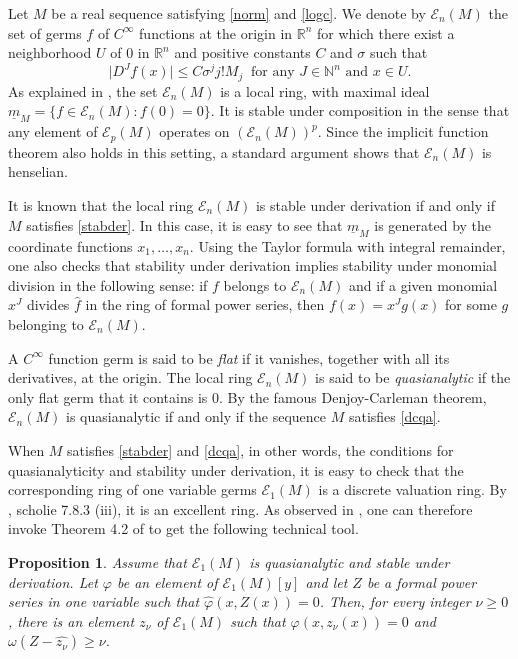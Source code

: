 \documentclass[a4paper]{amsart}
\theoremstyle{plain}
\newtheorem{prop}{Proposition}
\theoremstyle{remark}
\newcommand{\imax}{\underline{m}}
\begin{document}
Let $ M $ be a real sequence satisfying \eqref{norm} and \eqref{logc}. We denote by $ \mathcal{E}_n(M) $ the set of germs $ f $ of $ C^\infty $ functions at the origin in $ \mathbb{R}^n $ for which there exist a neighborhood $ U $ of $ 0 $ in $ \mathbb{R}^n $ and positive constants $ C $ and $ \sigma $ such that
\begin{equation}
\big\vert D^Jf(x)\big\vert \leq C\sigma^jj!M_j\ \textrm{ for any } J\in \mathbb{N}^n\textrm{ and } x\in U.
\end{equation}
As explained in \cite{Th}, the set $ \mathcal{E}_n(M) $ is a local ring, with maximal ideal $ \imax_M=\{f\in\mathcal{E}_n(M) : f(0)=0\} $. It is stable under composition in the sense that any element of $ \mathcal{E}_p(M) $ operates on $ (\mathcal{E}_n(M))^p$. Since the implicit function theorem also holds in this setting, a standard argument shows that $ \mathcal{E}_n(M) $ is henselian.

It is known that the local ring $ \mathcal{E}_n(M) $ is stable under derivation if and only if $ M $ satisfies \eqref{stabder}. In this case, it is easy to see that $ \imax_M $ is generated by the coordinate functions $ x_1,\ldots,x_n $. Using the Taylor formula with integral remainder, one also checks that stability under derivation implies stability under monomial division in the following sense: if $ f $ belongs to $ \mathcal{E}_n(M) $ and if a given monomial $ x^J $ divides $ \widehat{f}$ in the ring of formal power series, then $ f(x)=x^Jg(x) $ for some $ g $ belonging to $ \mathcal{E}_n(M) $.  

A $ C^\infty$ function germ is said to be \emph{flat} if it vanishes, together with all its derivatives, at the origin. The local ring $ \mathcal{E}_n(M) $ is said to be \emph{quasianalytic} if the only flat germ that it contains is $ 0 $. By the famous Denjoy-Carleman theorem, $ \mathcal{E}_n(M) $ is quasianalytic if and only if the sequence $ M $ satisfies \eqref{dcqa}. 

When $ M $ satisfies \eqref{stabder} and \eqref{dcqa}, in other words, the conditions for quasianalyticity and stability under derivation, it is easy to check that the corresponding ring of one variable germs $ \mathcal{E}_1(M) $ is a discrete valuation ring. By \cite{Groth}, scholie 7.8.3 (iii), it is an excellent ring. As observed in \cite{Pier}, one can therefore invoke Theorem 4.2 of \cite{Ro} to get the following technical tool. 

\begin{prop}\label{Artin}
Assume that $ \mathcal{E}_1(M) $ is quasianalytic and stable under derivation. Let $ \varphi $ be an element of $ \mathcal{E}_1(M)[y] $ and let $ Z $ be a formal power series in one variable such that $ \widehat{\varphi}(x,Z(x))=0 $. Then, for every integer $ \nu\geq 0 $, there is an element $ z_\nu $ of $ \mathcal{E}_1(M) $ such that 
$ \varphi(x,z_\nu(x))=0 $ and $ \omega(Z-\widehat{z_\nu})\geq\nu $.
\end{prop}
\end{document}
